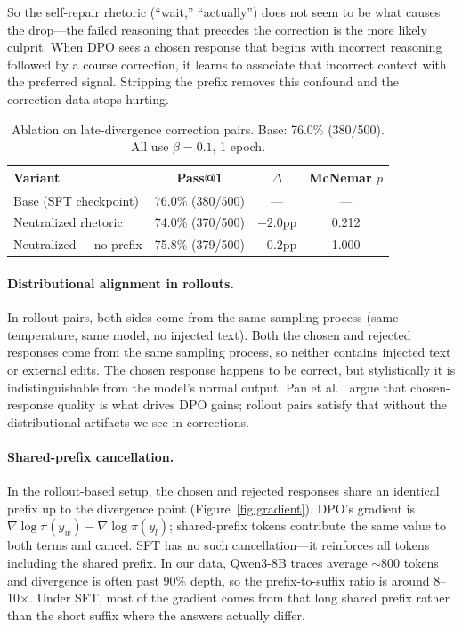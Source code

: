 \documentclass{article}
\begin{document}
So the self-repair rhetoric (``wait,'' ``actually'') does not seem to be what causes the drop---the failed reasoning that precedes the correction is the more likely culprit.
When DPO sees a chosen response that begins with incorrect reasoning followed by a course correction, it learns to associate that incorrect context with the preferred signal.
Stripping the prefix removes this confound and the correction data stops hurting.

\begin{table}[t]
    \centering
    \caption{Ablation on late-divergence correction pairs. Base: 76.0\% (380/500). All use $\beta = 0.1$, 1 epoch.}
    \vspace{0.5em}
    \begin{tabular}{lccc}
        \toprule
        Variant & Pass@1 & $\Delta$ & McNemar $p$ \\
        \midrule
        Base (SFT checkpoint) & 76.0\% (380/500) & --- & --- \\
        Neutralized rhetoric & 74.0\% (370/500) & $-2.0$pp & 0.212 \\
        Neutralized + no prefix & 75.8\% (379/500) & $-0.2$pp & 1.000 \\
        \bottomrule
    \end{tabular}
    \label{tab:ablation}
\end{table}

\paragraph{Distributional alignment in rollouts.}
In rollout pairs, both sides come from the same sampling process (same temperature, same model, no injected text).
Both the chosen and rejected responses come from the same sampling process, so neither contains injected text or external edits.
The chosen response happens to be correct, but stylistically it is indistinguishable from the model's normal output.
Pan et al.~\cite{whatmatters2025} argue that chosen-response quality is what drives DPO gains; rollout pairs satisfy that without the distributional artifacts we see in corrections.

\paragraph{Shared-prefix cancellation.}
In the rollout-based setup, the chosen and rejected responses share an identical prefix up to the divergence point (Figure~\ref{fig:gradient}).
DPO's gradient is $\nabla \log \pi(y_w) - \nabla \log \pi(y_l)$; shared-prefix tokens contribute the same value to both terms and cancel.
SFT has no such cancellation---it reinforces all tokens including the shared prefix.
In our data, Qwen3-8B traces average $\sim$800 tokens and divergence is often past 90\% depth, so the prefix-to-suffix ratio is around 8--10$\times$.
Under SFT, most of the gradient comes from that long shared prefix rather than the short suffix where the answers actually differ.
\end{document}

